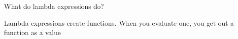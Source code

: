 \begin{blocksection}
\question What do lambda expressions do?

\begin{solution}[0.25in]
Lambda expressions create functions. When you evaluate one, you get out a function as a value
\end{solution}
\end{blocksection}
